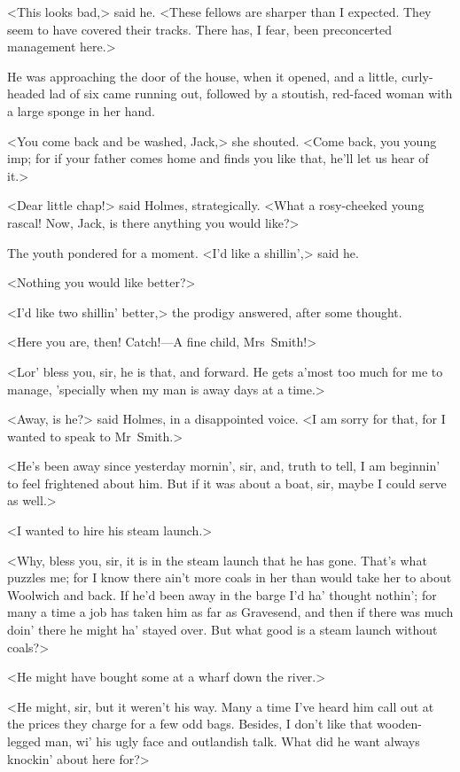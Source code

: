 <This looks bad,> said he. <These fellows are sharper than I expected. They seem to have covered their tracks. There has, I fear, been preconcerted management here.>

He was approaching the door of the house, when it opened, and a little, curly-headed lad of six came running out, followed by a stoutish, red-faced woman with a large sponge in her hand.

<You come back and be washed, Jack,> she shouted. <Come back, you young imp; for if your father comes home and finds you like that, he'll let us hear of it.>

<Dear little chap!> said Holmes, strategically. <What a rosy-cheeked young rascal! Now, Jack, is there anything you would like?>

The youth pondered for a moment. <I'd like a shillin',> said he.

<Nothing you would like better?>

<I'd like two shillin' better,> the prodigy answered, after some thought.

<Here you are, then! Catch!—A fine child, Mrs~Smith!>

<Lor' bless you, sir, he is that, and forward. He gets a'most too much for me to manage, 'specially when my man is away days at a time.>

<Away, is he?> said Holmes, in a disappointed voice. <I am sorry for that, for I wanted to speak to Mr~Smith.>

<He's been away since yesterday mornin', sir, and, truth to tell, I am beginnin' to feel frightened about him. But if it was about a boat, sir, maybe I could serve as well.>

<I wanted to hire his steam launch.>

<Why, bless you, sir, it is in the steam launch that he has gone. That's what puzzles me; for I know there ain't more coals in her than would take her to about Woolwich and back. If he'd been away in the barge I'd ha' thought nothin'; for many a time a job has taken him as far as Gravesend, and then if there was much doin' there he might ha' stayed over. But what good is a steam launch without coals?>

<He might have bought some at a wharf down the river.>

<He might, sir, but it weren't his way. Many a time I've heard him call out at the prices they charge for a few odd bags. Besides, I don't like that wooden-legged man, wi' his ugly face and outlandish talk. What did he want always knockin' about here for?>

